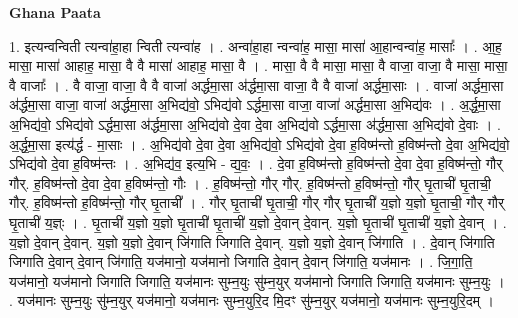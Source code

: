 \documentclass[17pt]{extarticle}
\begin{document}
\textbf{Ghana Paata } \newline

1. इत्यन्वन्विती त्यन्वा॑हा॒हा न्विती त्यन्वा॑ह । . अन्वा॑हा॒हा न्वन्वा॑ह॒ मासा॒ मासा॑ आ॒हान्वन्वा॑ह॒ मासाः᳚ । . आ॒ह॒ मासा॒ मासा॑ आहाह॒ मासा॒ वै वै मासा॑ आहाह॒ मासा॒ वै । . मासा॒ वै वै मासा॒ मासा॒ वै वाजा॒ वाजा॒ वै मासा॒ मासा॒ वै वाजाः᳚ । . वै वाजा॒ वाजा॒ वै वै वाजा॑ अर्द्धमा॒सा अ॑र्द्धमा॒सा वाजा॒ वै वै वाजा॑ अर्द्धमा॒साः । . वाजा॑ अर्द्धमा॒सा अ॑र्द्धमा॒सा वाजा॒ वाजा॑ अर्द्धमा॒सा अ॒भिद्य॑वो॒ ऽभिद्य॑वो ऽर्द्धमा॒सा वाजा॒ वाजा॑ अर्द्धमा॒सा अ॒भिद्य॑वः । . अ॒र्द्ध॒मा॒सा अ॒भिद्य॑वो॒ ऽभिद्य॑वो ऽर्द्धमा॒सा अ॑र्द्धमा॒सा अ॒भिद्य॑वो दे॒वा दे॒वा अ॒भिद्य॑वो ऽर्द्धमा॒सा अ॑र्द्धमा॒सा अ॒भिद्य॑वो दे॒वाः । . अ॒र्द्ध॒मा॒सा इत्य॑र्द्ध - मा॒साः । . अ॒भिद्य॑वो दे॒वा दे॒वा अ॒भिद्य॑वो॒ ऽभिद्य॑वो दे॒वा ह॒विष्म॑न्तो ह॒विष्म॑न्तो दे॒वा अ॒भिद्य॑वो॒ ऽभिद्य॑वो दे॒वा ह॒विष्म॑न्तः । . अ॒भिद्य॑व॒ इत्य॒भि - द्य॒वः॒ । . दे॒वा ह॒विष्म॑न्तो ह॒विष्म॑न्तो दे॒वा दे॒वा ह॒विष्म॑न्तो॒ गौर् गौर्. ह॒विष्म॑न्तो दे॒वा दे॒वा ह॒विष्म॑न्तो॒ गौः । . ह॒विष्म॑न्तो॒ गौर् गौर्. ह॒विष्म॑न्तो ह॒विष्म॑न्तो॒ गौर् घृ॒ताची॑ घृ॒ताची॒ गौर्. ह॒विष्म॑न्तो ह॒विष्म॑न्तो॒ गौर् घृ॒ताची᳚ । . गौर् घृ॒ताची॑ घृ॒ताची॒ गौर् गौर् घृ॒ताची॑ य॒ज्ञो य॒ज्ञो घृ॒ताची॒ गौर् गौर् घृ॒ताची॑ य॒ज्ञ्ः । . घृ॒ताची॑ य॒ज्ञो य॒ज्ञो घृ॒ताची॑ घृ॒ताची॑ य॒ज्ञो दे॒वान् दे॒वान्. य॒ज्ञो घृ॒ताची॑ घृ॒ताची॑ य॒ज्ञो दे॒वान् । . य॒ज्ञो दे॒वान् दे॒वान्. य॒ज्ञो य॒ज्ञो दे॒वान् जि॑गाति जिगाति दे॒वान्. य॒ज्ञो य॒ज्ञो दे॒वान् जि॑गाति । . दे॒वान् जि॑गाति जिगाति दे॒वान् दे॒वान् जि॑गाति॒ यज॑मानो॒ यज॑मानो जिगाति दे॒वान् दे॒वान् जि॑गाति॒ यज॑मानः । . जि॒गा॒ति॒ यज॑मानो॒ यज॑मानो जिगाति जिगाति॒ यज॑मानः सुम्न॒युः सु॑म्न॒युर् यज॑मानो जिगाति जिगाति॒ यज॑मानः सुम्न॒युः । . यज॑मानः सुम्न॒युः सु॑म्न॒युर् यज॑मानो॒ यज॑मानः सुम्न॒युरि॒द मि॒दꣳ सु॑म्न॒युर् यज॑मानो॒ यज॑मानः सुम्न॒युरि॒दम् । \newline
\end{document}

